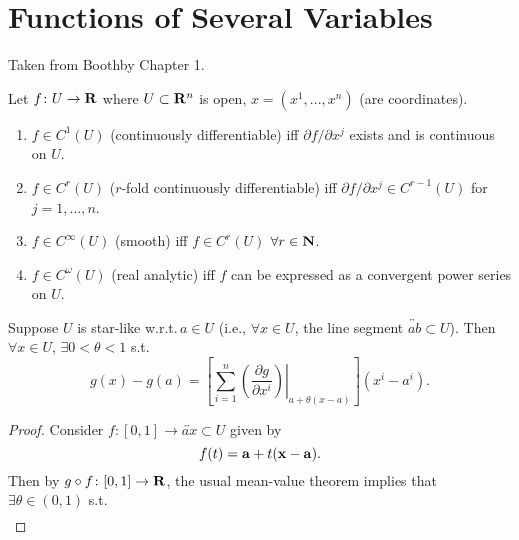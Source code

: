 \chapter{Functions of Several Variables}
Taken from Boothby Chapter 1.
\begin{definition}
Let $f\colon U\to\mathbf{R}$ where $U\subset\mathbf{R}^n$ is open, $x=(x^1,...,x^n)$
(are coordinates).
\begin{enumerate}[label=(\alph*)]
\item $f\in C^1(U)$ (continuously differentiable) iff $\partial f/\partial
  x^j$ exists and is continuous on $U$.
\item $f\in C^r(U)$ ($r$-fold continuously differentiable) iff $\partial
  f/\partial x^j\in C^{r-1}(U)$ for $j=1,...,n$.
\item $f\in C^\infty(U)$ (smooth) iff $f\in C^r(U)$ $\forall r\in\mathbf{N}$.
\item $f\in C^\omega(U)$ (real analytic) iff $f$ can be expressed as a
  convergent power series on $U$.
\end{enumerate}
\end{definition}
\begin{theorem}
Suppose $U$ is star-like w.r.t.\,$a\in U$ (i.e., $\forall x\in U$, the line
segment $\overleftrightarrow{ab}\subset U$). Then $\forall x\in U$,
$\exists 0<\theta<1$ s.t.
\[
g(x)-g(a)=\left[\sum_{i=1}^n
\left.\left(\frac{\partial g}{\partial x^i}\right)\right|_{a+\theta(x-a)}
\right](x^i-a^i).
\]
\end{theorem}
\begin{proof}
Consider $f\colon[0,1]\to\overleftrightarrow{ax}\subset U$ given by
\[
f(t)=\mathbf{a}+t(\mathbf{x}-\mathbf{a}).
\]
Then by $g\circ f\colon[0,1]\to\mathbf{R}$, the usual mean-value theorem implies
that $\exists\theta\in(0,1)$ s.t.
\begin{align*}

\end{align*}
\]
\end{proof}

